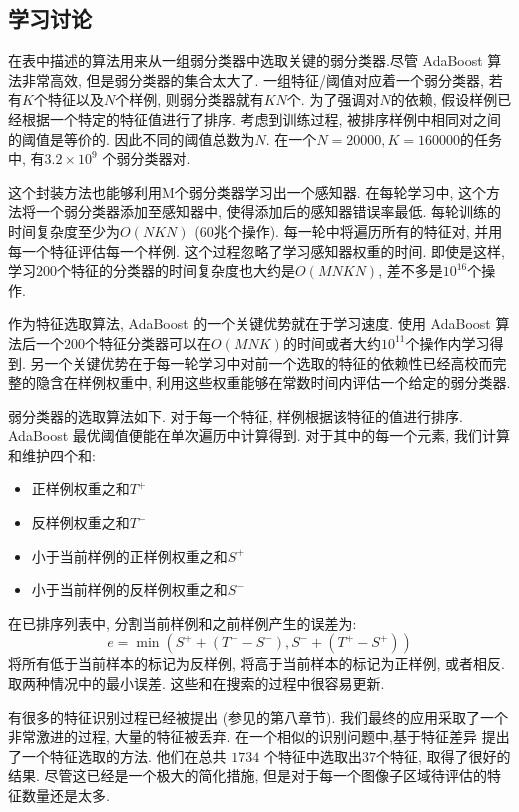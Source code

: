 \documentclass[a4paper,utf8,11pt, onecolumn]{ctexart}
\begin{document}
\subsection{学习讨论}
在表中描述的算法用来从一组弱分类器中选取关键的弱分类器.尽管 AdaBoost 算法非常高效, 但是弱分类器的集合太大了. 一组特征/阈值对应着一个弱分类器, 若有$K$个特征以及$N$个样例, 则弱分类器就有$KN$个. 为了强调对$N$的依赖, 假设样例已经根据一个特定的特征值进行了排序. 考虑到训练过程, 被排序样例中相同对之间的阈值是等价的. 因此不同的阈值总数为$N$. 在一个$N=20000, K=160000$的任务中, 有$3.2\times 10^9$ 个弱分类器对.

这个封装方法也能够利用M个弱分类器学习出一个感知器\citep{john1994irrelevant}. 在每轮学习中, 这个方法将一个弱分类器添加至感知器中, 使得添加后的感知器错误率最低. 每轮训练的时间复杂度至少为$O(NKN)$ ($60$兆个操作). 每一轮中将遍历所有的特征对, 并用每一个特征评估每一个样例.
这个过程忽略了学习感知器权重的时间. 即使是这样, 学习$200$个特征的分类器的时间复杂度也大约是$O(MNKN)$, 差不多是$10^{16}$个操作.

作为特征选取算法, AdaBoost 的一个关键优势就在于学习速度. 使用 AdaBoost 算法后一个$200$个特征分类器可以在$O(MNK)$的时间或者大约$10^{11}$个操作内学习得到. 另一个关键优势在于每一轮学习中对前一个选取的特征的依赖性已经高校而完整的隐含在样例权重中, 利用这些权重能够在常数时间内评估一个给定的弱分类器.

弱分类器的选取算法如下. 对于每一个特征, 样例根据该特征的值进行排序. AdaBoost 最优阈值便能在单次遍历中计算得到. 对于其中的每一个元素, 我们计算和维护四个和:
\begin{itemize}
\item 正样例权重之和$T^+$
\item 反样例权重之和$T^-$
\item 小于当前样例的正样例权重之和$S^+$
\item 小于当前样例的反样例权重之和$S^-$
\end{itemize}
在已排序列表中, 分割当前样例和之前样例产生的误差为:
\[
e=\min(S^++(T^--S^-),S^-+(T^+-S^+))
\]
将所有低于当前样本的标记为反样例, 将高于当前样本的标记为正样例, 或者相反. 取两种情况中的最小误差. 这些和在搜索的过程中很容易更新.

有很多的特征识别过程已经被提出 (参见\citet{webb1999statistical}的第八章节). 我们最终的应用采取了一个非常激进的过程, 大量的特征被丢弃. 在一个相似的识别问题中,\citet{papageorgiou1998general}基于特征差异
提出了一个特征选取的方法. 他们在总共 $1734$ 个特征中选取出$37$个特征, 取得了很好的结果. 尽管这已经是一个极大的简化措施, 但是对于每一个图像子区域待评估的特征数量还是太多.
\end{document}

